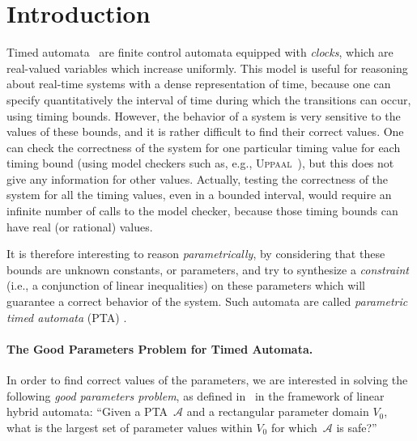 \documentclass[a4paper,10pt]{article}
\newcommand{\A}{\mathcal{A}}
\newcommand{\imitator}{\textsc{Imitator}}
\newcommand{\uppaal}{\textsc{Uppaal}}
\newcommand{\imitatorversion}{2.2}
\newcommand{\paragraphe}[1]{\paragraph{#1.}}
\begin{document}
\lhead{\fancyplain{}{\imitator{} \imitatorversion{} User Manual}}


\section{Introduction}

Timed automata~\cite{ad94} are finite control automata equipped with {\em clocks}, which are real-valued variables which increase uniformly.
This model is useful for reasoning about real-time systems with a dense representation of time, because one can specify quantitatively the interval of time during which the transitions can occur, using timing bounds.
However, the behavior of a system is very sensitive to the values of these bounds, and it is rather difficult to find their correct values.
One can check the correctness of the system for one particular timing value for each timing bound (using model checkers such as, e.g., \uppaal{}~\cite{lpy97}), but this does not give any information for other values.
Actually, testing the correctness of the system for all the timing values, even in a bounded interval, would require an infinite number of calls to the model checker, because those timing bounds can have real (or rational) values.

It is therefore interesting to reason \emph{parametrically}, by considering that these bounds are unknown constants, or parameters, and try to synthesize a {\em constraint} (i.e., a conjunction of linear inequalities) on these parameters which will guarantee a correct behavior of the system.
Such automata are called \emph{parametric timed automata} (PTA) \cite{ahv93}. %

\paragraphe{The Good Parameters Problem for Timed Automata}
In order to find correct values of the parameters, we are interested in solving the following \emph{good parameters problem}, as defined in~\cite{fjk08} in the framework of linear hybrid automata:
``Given a PTA~$\A$ and a rectangular parameter domain $V_0$, what is the largest set of parameter values within $V_0$ for which~$\A$ is safe?''
\end{document}

